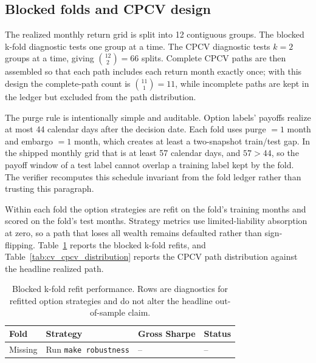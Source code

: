 \subsection{Blocked folds and CPCV design}

The realized monthly return grid is split into 12 contiguous groups. The blocked k-fold
diagnostic tests one group at a time. The CPCV diagnostic tests \(k=2\) groups at a time,
giving \(\binom{12}{2}=66\) splits. Complete CPCV paths are then assembled so that each
path includes each return month exactly once; with this design the complete-path count is
\(\binom{11}{1}=11\), while incomplete paths are kept in the ledger but excluded from the
path distribution.

The purge rule is intentionally simple and auditable. Option labels' payoffs realize at
most 44 calendar days after the decision date. Each fold uses purge \(=1\) month and
embargo \(=1\) month, which creates at least a two-snapshot train/test gap. In the shipped
monthly grid that is at least 57 calendar days, and \(57>44\), so the payoff window of a
test label cannot overlap a training label kept by the fold. The verifier recomputes this
schedule invariant from the fold ledger rather than trusting this paragraph.

Within each fold the option strategies are refit on the fold's training months and scored
on the fold's test months. Strategy metrics use limited-liability absorption at zero, so a
path that loses all wealth remains defaulted rather than sign-flipping. Table~\ref{tab:cv_fold_performance}
reports the blocked k-fold refits, and Table~\ref{tab:cv_cpcv_distribution} reports the
CPCV path distribution against the headline realized path.

\clearpage

\begin{table}[H]
\centering
\scriptsize
{}
  {\resizebox{\textwidth}{!}{}}
  {\begin{tabular}{llll}\toprule Fold & Strategy & Gross Sharpe & Status \\\midrule Missing & Run \texttt{make robustness} & -- & -- \\\bottomrule\end{tabular}}
\caption{Blocked k-fold refit performance. Rows are diagnostics for refitted option
strategies and do not alter the headline out-of-sample claim.}
\label{tab:cv_fold_performance}
\end{table}

